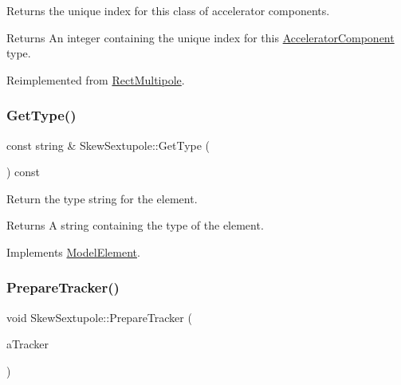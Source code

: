 Returns the unique index for this class of accelerator components. \begin{DoxyReturn}{Returns}
An integer containing the unique index for this \hyperlink{classAcceleratorComponent}{Accelerator\+Component} type. 
\end{DoxyReturn}


Reimplemented from \hyperlink{classRectMultipole_a9bc789b2a193e341aab8bbd47a0e3ad4}{Rect\+Multipole}.

\mbox{\label{classSkewSextupole_ae10ab2f55d9cf84bdab2cb2f707c8758}} 
\subsubsection{\texorpdfstring{Get\+Type()}{GetType()}}
{\footnotesize\ttfamily const string \& Skew\+Sextupole\+::\+Get\+Type (\begin{DoxyParamCaption}{ }\end{DoxyParamCaption}) const\hspace{0.3cm}{\ttfamily [virtual]}}

Return the type string for the element. \begin{DoxyReturn}{Returns}
A string containing the type of the element. 
\end{DoxyReturn}


Implements \hyperlink{classModelElement_a04dc2e51e1999fca612eb1838ec6b271}{Model\+Element}.

\mbox{\label{classSkewSextupole_a8700a80f9f1863d5f6966cf0827ed342}} 
\subsubsection{\texorpdfstring{Prepare\+Tracker()}{PrepareTracker()}}
{\footnotesize\ttfamily void Skew\+Sextupole\+::\+Prepare\+Tracker (\begin{DoxyParamCaption}\item[{\hyperlink{classComponentTracker}{Component\+Tracker} \&}]{a\+Tracker }\end{DoxyParamCaption})\hspace{0.3cm}{\ttfamily [virtual]}}

